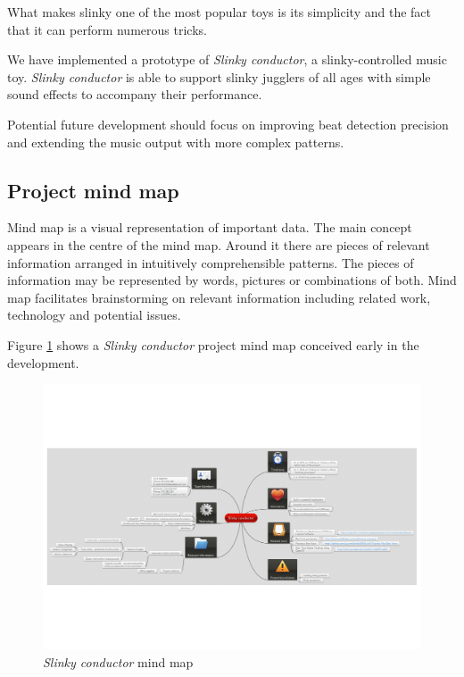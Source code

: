 \documentclass[fonts]{icst}
\newcommand{\slinkyconductor}{\emph{Slinky conductor}}
\begin{document}
What makes slinky one of the most popular toys is its simplicity
and the fact that it can perform numerous tricks.

We have implemented a prototype of \slinkyconductor{},
a slinky-controlled music toy.
\slinkyconductor{} is able to support slinky jugglers of all ages
with simple sound effects to accompany their performance.

Potential future development should focus on
improving beat detection precision
and extending the music output with more complex patterns.

\pagebreak

\begin{appendices}

\section{Project mind map}
\label{app:mindmap}


Mind map is a visual representation of important data.
The main concept appears in the centre of the mind map.
Around it there are pieces of relevant information
arranged in intuitively comprehensible patterns.
The pieces of information may be represented by words,
pictures or combinations of both.
Mind map facilitates brainstorming on relevant information
including related work, technology and potential issues.

Figure \ref{fig:mind_map2} shows a \slinkyconductor{} project mind map
conceived early in the development.

\newpage
\begin{figure}
  \centering
  \includegraphics[width=\textheight]{Slinky_conductor.pdf}
  \caption{\slinkyconductor{} mind map}
  \label{fig:mind_map2}
\end{figure}
\newpage

\end{appendices}



\printglossaries{}
\end{document}
